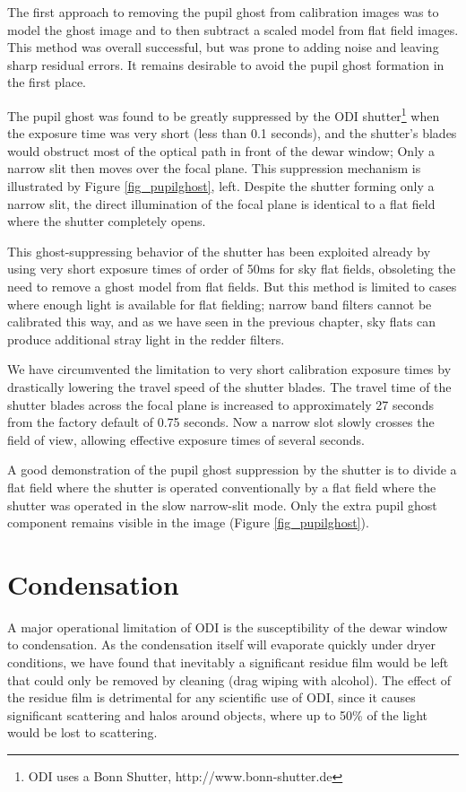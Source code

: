\documentclass[]{spieman}
\begin{document}
The first approach to removing the pupil ghost from calibration images was to
model the ghost image and to then subtract a scaled model from flat field
images. This method was overall successful, but was prone to adding noise and
leaving sharp residual errors. It remains desirable to avoid the pupil ghost
formation in the first place.

The pupil ghost was found to be greatly suppressed by the ODI
shutter\footnote{ODI uses a Bonn Shutter, http://www.bonn-shutter.de} when the
exposure time was very short (less than 0.1 seconds), and the shutter's blades
would obstruct most of the optical path in front of the dewar window; Only a narrow
slit then moves  over the focal plane. This suppression mechanism is illustrated
by Figure \ref{fig_pupilghost}, left. Despite the shutter forming
only a narrow slit, the direct illumination of the focal plane is identical to a
flat field where the shutter completely opens.

This ghost-suppressing behavior of the shutter has been exploited already by
using very short exposure times of order of 50ms for sky flat fields, obsoleting
the need to remove a ghost model from flat fields. But this method is limited to
cases where enough light is available for flat fielding; narrow band filters
cannot be calibrated this way, and as we have seen in the previous chapter, sky
flats can produce additional stray light in the redder filters.

We have circumvented the limitation to very short calibration exposure times by
drastically lowering the travel speed of the shutter blades. The travel time of
the shutter blades across the focal plane is increased to approximately  27
seconds from the factory default of 0.75 seconds.  Now a narrow slot slowly
crosses the field of view, allowing effective exposure times of several seconds.

A good demonstration of the pupil ghost suppression by the shutter is to divide
a flat field where the shutter is operated conventionally by a flat field where
the shutter was operated in the slow narrow-slit mode. Only the extra pupil ghost
component remains visible in the image (Figure \ref{fig_pupilghost}).


\section{Condensation}

A major operational limitation of ODI is the susceptibility of the dewar window
to condensation. As the condensation itself will evaporate quickly under dryer
conditions, we have found that inevitably a significant residue film would be
left that could only be removed by  cleaning (drag wiping with alcohol).
The effect of the residue film is detrimental for any scientific use of ODI,
since it causes significant scattering and halos around objects, where up to 
50\%  of the light would be lost to scattering.
\end{document}
